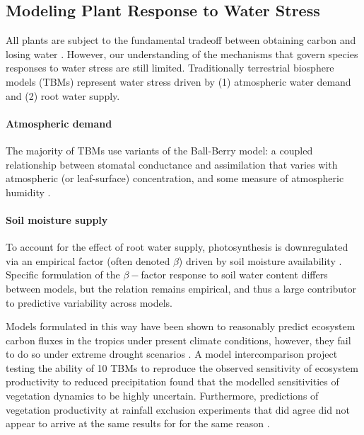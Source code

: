 \subsection*{Modeling Plant Response to Water Stress}

All plants are subject to the fundamental tradeoff between obtaining carbon and losing water \citep{bonan_2014}.  However, our understanding of the mechanisms that govern species responses to water stress are still limited. Traditionally terrestrial biosphere models (TBMs) represent water stress driven by (1) atmospheric water demand and (2) root water supply.

\paragraph{Atmospheric demand}

The majority of TBMs use variants of the Ball-Berry model: a coupled relationship between stomatal conductance and  assimilation that varies with atmospheric (or leaf-surface)  concentration, and some measure of atmospheric humidity \citep{farquhar_1984, ball_1987, leuning_1995, medlyn_2011}.

\paragraph{Soil moisture supply}

To account for the effect of root water supply, photosynthesis is downregulated via an empirical factor (often denoted $\beta$) driven by soil moisture availability \citep{rogers_2017}. Specific formulation of the $\beta-$factor response to soil water content differs between models, but the relation remains empirical, and thus a large contributor to predictive variability across models. 
 
Models formulated in this way have been shown to reasonably predict ecosystem carbon fluxes in the tropics under present climate conditions, however, they fail to do  so under extreme drought scenarios  \citep{powell_2013, zhang_2015}. A model intercomparison project testing the ability of 10 TBMs to reproduce the observed sensitivity of ecosystem productivity to reduced precipitation found that the modelled sensitivities of vegetation dynamics to be highly uncertain. Furthermore, predictions of vegetation productivity at rainfall exclusion experiments that did agree did not appear to arrive at the same results for for the same reason \citep{paschalis_2020}.

